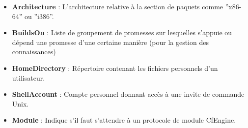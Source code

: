 \begin{itemize}
  \item \textbf{Architecture} : L'architecture relative à la section de paquets
	  comme ''x86-64'' ou ''i386''.
  \item \textbf{BuildsOn} : Liste de groupement de promesses sur lesquelles
	  s'appuie ou dépend une promesse d'une certaine manière (pour la
	  gestion des connaissances)
  \item \textbf{HomeDirectory} : Répertoire contenant les fichiers personnels
	  d'un utilisateur.
  \item \textbf{ShellAccount} : Compte personnel donnant accès à une invite de
	  commande Unix.
  \item \textbf{Module} : Indique s'il faut s'attendre à un protocole de module
	  CfEngine.
\end{itemize}

